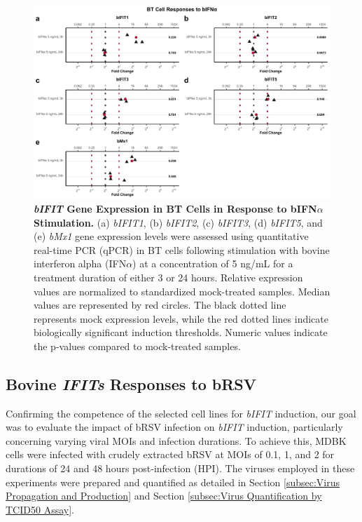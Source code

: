 \begin{figure}
    \centering
    \includegraphics[width=1\linewidth]{07. Chapter 2/Figs/02. Induction/08. bt_bifna.pdf}
    \caption[\textit{bIFIT} Gene Expression in BT Cells in Response to bIFN\(\alpha\) Stimulation.]{\textbf{\textit{bIFIT} Gene Expression in BT Cells in Response to bIFN\(\alpha\) Stimulation.} (a) \textit{bIFIT1}, (b) \textit{bIFIT2}, (c) \textit{bIFIT3}, (d) \textit{bIFIT5}, and (e) \textit{bMx1} gene expression levels were assessed using quantitative real-time PCR (qPCR) in BT cells following stimulation with bovine interferon alpha (IFN\(\alpha\)) at a concentration of 5 ng/mL for a treatment duration of either 3 or 24 hours. Relative expression values are normalized to standardized mock-treated samples. Median values are represented by red circles. The black dotted line represents mock expression levels, while the red dotted lines indicate biologically significant induction thresholds. Numeric values indicate the p-values compared to mock-treated samples.}
    \label{fig:BT responses to bifna}
\end{figure}

\subsection{Bovine \textit{IFITs} Responses to bRSV} \label{subsec:Bovine IFITs Responses to bRSV}
Confirming the competence of the selected cell lines for \textit{bIFIT} induction, our goal was to evaluate the impact of bRSV infection on \textit{bIFIT} induction, particularly concerning varying viral MOIs and infection durations. To achieve this, MDBK cells were infected with crudely extracted bRSV at MOIs of 0.1, 1, and 2 for durations of 24 and 48 hours post-infection (HPI). The viruses employed in these experiments were prepared and quantified as detailed in Section \ref{subsec:Virus Propagation and Production} and Section \ref{subsec:Virus Quantification by TCID50 Assay}.

